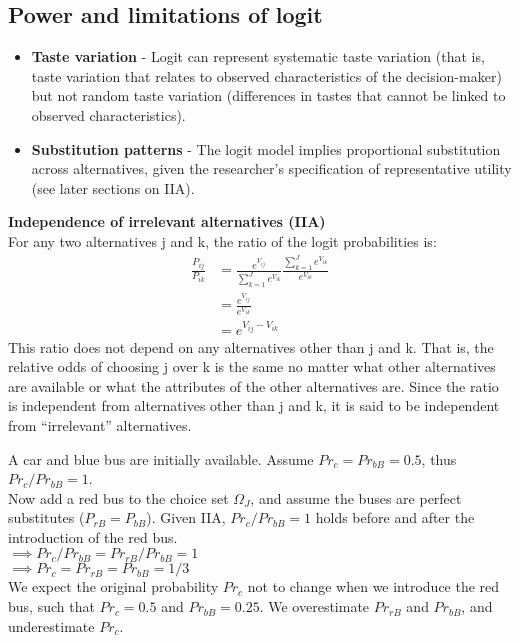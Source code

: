 \documentclass[DIV=14,titlepage=false]{scrreprt}
\begin{document}
\subsection{Power and limitations of logit}
\begin{itemize}
\item \textbf{Taste variation} - Logit can represent systematic taste variation (that is, taste
variation that relates to observed characteristics of the decision-maker) but not random taste variation (differences in tastes that cannot be linked to observed characteristics).
\item \textbf{Substitution patterns} - The logit model implies proportional substitution across alternatives, given the researcher’s specification of representative utility (see later sections on IIA).
\end{itemize}
\textbf{Independence of irrelevant alternatives (IIA)}\\
For any two alternatives j and k, the ratio of the logit probabilities is:
\begin{align*}
    \frac{P_{ij}}{P_{ik}} &= \frac{e^{V_{ij}}}{\sum_{k=1}^J e^{V_{ik}}} \frac{\sum_{k=1}^J e^{V_{ik}}}{e^{V_{ik}}} \\
    &= \frac{e^{V_{ij}}}{e^{V_{ik}}} \\
    &= e^{V_{ij} - V_{ik}}
\end{align*}
This ratio does not depend on any alternatives other than j and k. That is, the relative odds of choosing j over k is the same no matter what other alternatives are available or what the attributes of the other alternatives are. Since the ratio is independent from alternatives other than j and k, it is said to be independent from “irrelevant” alternatives. 
\begin{example}
   A car and blue bus are initially available. Assume $Pr_c = Pr_{bB} = 0.5$, thus $Pr_c/Pr_{bB} = 1$.\\
   Now add a red bus to the choice set $\Omega_J$, and assume the buses are perfect substitutes ($P_{rB} = P_{bB}$). Given IIA, $Pr_c/Pr_{bB} =1$ holds before and after the introduction of the red bus.\\
   $\implies Pr_c/Pr_{bB} = Pr_{rB}/Pr_{bB} = 1$\\
   $\implies Pr_c = Pr_{rB} = Pr_{bB} = 1/3$\\
   We expect the original probability $Pr_c$ not to change when we introduce the red bus, such that $Pr_c = 0.5$ and $Pr_{bB} = 0.25$. We overestimate $Pr_{rB}$ and $Pr_{bB}$, and underestimate $Pr_c$.
\end{example}
\end{document}
